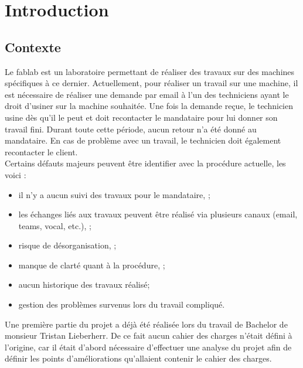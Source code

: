 \documentclass[
    iai, %
    il, %
]{heig-tb}
\begin{document}
\maketitle
\frontmatter
\clearemptydoublepage

\preamble
\authentification

\begin{abstract}
    
\end{abstract}

\clearemptydoublepage
{
    \tableofcontents
    \let\cleardoublepage\clearpage
    \listoffigures
    \let\cleardoublepage\clearpage
    \listoftables
    \let\cleardoublepage\clearpage
    \listoflistings
}

\printnomenclature
\clearemptydoublepage
{}

\mainmatter

\chapter{Introduction}

\section{Contexte}
Le \Gls{fablab} est un laboratoire permettant de réaliser des travaux sur des machines spécifiques à ce dernier. Actuellement, pour réaliser un travail sur une machine, il est nécessaire de réaliser une demande par email à l'un des techniciens ayant le droit d'usiner sur la machine souhaitée. Une fois la demande reçue, le technicien usine dès qu'il le peut et doit recontacter le mandataire pour lui donner son travail fini. Durant toute cette période, aucun retour n'a été donné au mandataire. En cas de problème avec un travail, le technicien doit également recontacter le client.\\
Certains défauts majeurs peuvent être identifier avec la procédure actuelle, les voici :
\begin{itemize}
    \item il n'y a aucun suivi des travaux pour le mandataire, \cite{lieberherr};
    \item les échanges liés aux travaux peuvent être réalisé via plusieurs canaux (email, \Gls{teams}, vocal, etc.), \cite{lieberherr};
    \item risque de désorganisation, \cite{lieberherr};
    \item manque de clarté quant à la procédure, \cite{lieberherr};
    \item aucun historique des travaux réalisé;
    \item gestion des problèmes survenus lors du travail compliqué.
\end{itemize}
Une première partie du projet a déjà été réalisée lors du travail de Bachelor de monsieur Tristan Lieberherr. De ce fait aucun cahier des charges n'était défini à l'origine, car il était d'abord nécessaire d'effectuer une analyse du projet afin de définir les points d'améliorations qu'allaient contenir le cahier des charges.
\end{document}
